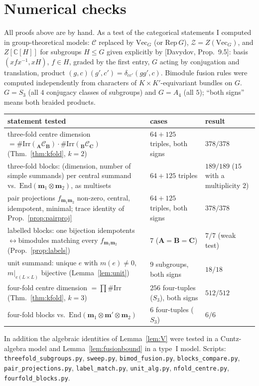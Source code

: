 \documentclass[11pt]{article}
\theoremstyle{definition}
\theoremstyle{remark}
\newcommand{\bfB}{\mathbf B}
\newcommand{\bfA}{\mathbf A}
\newcommand{\bfC}{\mathbf C}
\begin{document}
\section{Numerical checks}\label{app:num}
All proofs above are by hand. As a test of the categorical statements I computed in group-theoretical models: $\mathcal C$ replaced by $\mathrm{Vec}_G$ (or $\mathrm{Rep}\,G$), $\mathcal Z=Z(\mathrm{Vec}_G)$, and $Z[\mathbb C[H]]$ for subgroups $H\le G$ given explicitly by [Davydov, Prop.~9.5]: basis $(xfx^{-1},xH)$, $f\in H$, graded by the first entry, $G$ acting by conjugation and translation, product $(g,c)(g',c')=\delta_{cc'}(gg',c)$. Bimodule fusion rules were computed independently from characters of $K\times K'$-equivariant bundles on $G$. $G=S_3$ (all $4$ conjugacy classes of subgroups) and $G=A_4$ (all $5$); ``both signs'' means both braided products.
\begin{center}
\small
\begin{tabular}{p{}p{}p{}}
\hline
statement tested & cases & result\\\hline
three-fold centre dimension $=\#\mathrm{Irr}({}_{\bfA}\mathcal C_{\bfB})\cdot\#\mathrm{Irr}({}_{\bfB}\mathcal C_{\bfC})$ (Thm.~\ref{thm:kfold}, $k=2$) & $64+125$ triples, both signs & $378/378$\\
three-fold blocks: (dimension, number of simple summands) per central summand vs.\ $\mathrm{End}(\mathbf m_1\otimes\mathbf m_2)$, as multisets & $64+125$ triples & $189/189$ ($15$ with a multiplicity $2$)\\
pair projections $f_{\mathbf m_1\mathbf m_2}$ non-zero, central, idempotent, minimal; trace identity of Prop.~\ref{prop:pairproj} & $64+125$ triples, both signs & $378/378$\\
labelled blocks: one bijection idempotents$\leftrightarrow$bimodules matching every $f_{\mathbf m_1\mathbf m_2}$ (Prop.~\ref{prop:labels}) & $7$ ($\bfA=\bfB=\bfC$) & $7/7$ (weak test)\\
unit summand: unique $e$ with $m(e)\ne0$, $m|_{e(L\times L)}$ bijective (Lemma~\ref{lem:unit}) & $9$ subgroups, both signs & $18/18$\\
four-fold centre dimension $=\prod\#\mathrm{Irr}$ (Thm.~\ref{thm:kfold}, $k=3$) & $256$ four-tuples ($S_3$), both signs & $512/512$\\
four-fold blocks vs.\ $\mathrm{End}(\mathbf m_1\otimes\mathbf m'\otimes\mathbf m_2)$ & $6$ four-tuples ($S_3$) & $6/6$\\\hline
\end{tabular}
\end{center}
In addition the algebraic identities of Lemma~\ref{lem:V} were tested in a Cuntz-algebra model and Lemma~\ref{lem:fusionbound} in a type~I model. Scripts: \texttt{threefold\_subgroups.py}, \texttt{sweep.py}, \texttt{bimod\_fusion.py}, \texttt{blocks\_compare.py}, \texttt{pair\_projections.py}, \texttt{label\_match.py}, \texttt{unit\_alg.py}, \texttt{nfold\_centre.py}, \texttt{fourfold\_blocks.py}.
\end{document}
